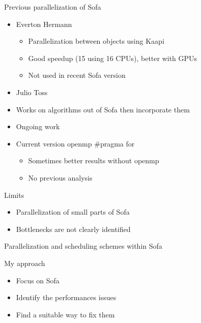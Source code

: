 \documentclass[xcolor={usenames,dvipsnames}]{beamer}
\begin{document}
\begin{frame}{Previous parallelization of Sofa}
    \begin{itemize}[<+->]
        \item Everton Hermann \cite{Hermann10Simulations} \\
            \begin{itemize}
                \item Parallelization between objects using Kaapi
                \item Good speedup (15 using 16 CPUs), better with GPUs
                \item Not used in recent Sofa version 
            \end{itemize}
        \item Julio Toss \cite{Toss12New}
        \item Works on algorithms out of Sofa then incorporate them
        \item Ongoing work
        \item Current version openmp \#pragma for
            \begin{itemize}
                \item Sometimes better results without openmp
                \item No previous analysis
            \end{itemize}
    \end{itemize}
    \pause
    \begin{alertblock}{Limits}
        \begin{itemize}
            \item Parallelization of small parts of Sofa
            \item Bottlenecks are not clearly identified
        \end{itemize}
    \end{alertblock}
\end{frame}
\begin{frame}{Parallelization and scheduling schemes within Sofa}

    \begin{alertblock}{My approach}
        \begin{itemize}
            \item Focus on Sofa 
            \item \alert{Identify the performances issues}
            \item Find a suitable way to fix them
        \end{itemize}
    \end{alertblock}
\end{frame}
\end{document}
